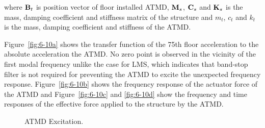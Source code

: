 where $\mathbf{B}_{t}$ is position vector of floor installed ATMD, $\mathbf{M}_{s}$, $\mathbf{C}_{s}$ and $\mathbf{K}_{s}$ is the mass, damping coefficient and stiffness matrix of the structure and $m_{t}$, $c_{t}$ and $k_{t}$ is the mass, damping coefficient and stiffness of the ATMD. 

Figure~\ref{fig:6-10a} shows the transfer function of the 75th floor acceleration to the absolute acceleration the ATMD. No zero point is observed in the vicinity of the first modal frequency unlike the case for LMS, which indicates that band-stop filter is not required for preventing the ATMD to excite the unexpected frequency response. Figure~\ref{fig:6-10b} shows the frequency response of the actuator force of the ATMD and Figure~\ref{fig:6-10c} and \ref{fig:6-10d} show the frequency and time responses of the effective force applied to the structure by the ATMD.

\begin{figure}[!ht]
\centering
{}
\caption{ATMD Excitation.}
\label{fig:6-10}
\end{figure}

